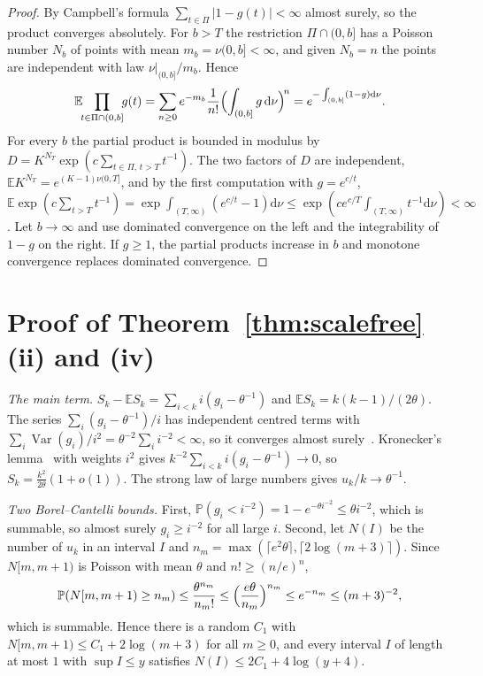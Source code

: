 \documentclass[aps,prd,twocolumn,superscriptaddress,nofootinbib,longbibliography,floatfix,amsmath,amssymb,10pt]{revtex4-2}
\theoremstyle{definition}
\theoremstyle{remark}
\newcommand{\E}{\mathbb{E}}
\renewcommand{\P}{\mathbb{P}}
\newcommand{\dd}{\mathrm{d}}
\DeclareMathOperator{\Var}{Var}
\begin{document}
\begin{proof}
By Campbell's formula $\sum_{t\in\Pi}|1-g(t)|<\infty$ almost surely, so the
product converges absolutely. For $b>T$ the restriction $\Pi\cap(0,b]$ has a
Poisson number $N_b$ of points with mean $m_b=\nu(0,b]<\infty$, and given
$N_b=n$ the points are independent with law $\nu|_{(0,b]}/m_b$. Hence
\[
\E\!\!\prod_{t\in\Pi\cap(0,b]}\!\!g(t)=\sum_{n\ge0}e^{-m_b}\frac{1}{n!}
\Bigl(\int_{(0,b]}g\,\dd\nu\Bigr)^{\!n}
=e^{-\int_{(0,b]}(1-g)\dd\nu}.
\]
For every $b$ the partial product is bounded in modulus by
$D=K^{N_T}\exp(c\sum_{t\in\Pi,\,t>T}t^{-1})$. The two factors of $D$ are
independent, $\E K^{N_T}=e^{(K-1)\nu(0,T]}$, and by the first computation
with $g=e^{c/t}$, $\E\exp(c\sum_{t>T}t^{-1})=\exp\int_{(T,\infty)}
(e^{c/t}-1)\dd\nu\le\exp(ce^{c/T}\int_{(T,\infty)}t^{-1}\dd\nu)<\infty$. Let
$b\to\infty$ and use dominated convergence on the left and the integrability
of $1-g$ on the right. If $g\ge1$, the partial products increase in $b$ and
monotone convergence replaces dominated convergence.
\end{proof}

\section{Proof of Theorem~\ref{thm:scalefree}(ii) and (iv)}\label{app:scalefree}

\emph{The main term.} $S_k-\E S_k=\sum_{i<k}i(g_i-\theta^{-1})$ and $\E
S_k=k(k-1)/(2\theta)$. The series $\sum_i(g_i-\theta^{-1})/i$ has
independent centred terms with $\sum_i\Var(g_i)/i^2=\theta^{-2}\sum_ii^{-2}
<\infty$, so it converges almost surely~\cite[Thm.~2.5.6]{Durrett2019}.
Kronecker's lemma~\cite[Thm.~2.5.9]{Durrett2019} with weights $i^2$ gives
$k^{-2}\sum_{i<k}i(g_i-\theta^{-1})\to0$, so $S_k=\frac{k^2}{2\theta}(1+o(1))$.
The strong law of large numbers gives $u_k/k\to\theta^{-1}$.

\emph{Two Borel--Cantelli bounds.} First, $\P(g_i<i^{-2})=1-e^{-\theta
i^{-2}}\le\theta i^{-2}$, which is summable, so almost surely $g_i\ge i^{-2}$
for all large $i$. Second, let $N(I)$ be the number of $u_k$ in an interval
$I$ and $n_m=\max(\lceil e^2\theta\rceil,\lceil2\log(m+3)\rceil)$. Since
$N[m,m+1)$ is Poisson with mean $\theta$ and $n!\ge(n/e)^n$,
\[
\P(N[m,m+1)\ge n_m)\le\frac{\theta^{n_m}}{n_m!}\le
\Bigl(\frac{e\theta}{n_m}\Bigr)^{n_m}\le e^{-n_m}\le(m+3)^{-2},
\]
which is summable. Hence there is a random $C_1$ with $N[m,m+1)\le C_1+
2\log(m+3)$ for all $m\ge0$, and every interval $I$ of length at most $1$
with $\sup I\le y$ satisfies $N(I)\le2C_1+4\log(y+4)$.
\end{document}
